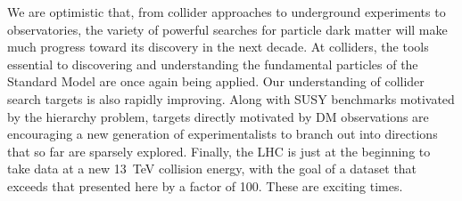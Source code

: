 We are optimistic that, from collider approaches to underground experiments to observatories, the variety of powerful searches for particle dark matter will make much progress toward its discovery in the next decade.
At colliders, the tools essential to discovering and understanding the fundamental particles of the Standard Model are once again being applied.
Our understanding of collider search targets is also rapidly improving.
Along with SUSY benchmarks motivated by the hierarchy problem, targets directly motivated by DM observations are encouraging a new generation of experimentalists to branch out into directions that so far are sparsely explored.
Finally, the LHC is just at the beginning to take data at a new 13~TeV collision energy, with the goal of a dataset that exceeds that presented here by a factor of 100.
These are exciting times.
